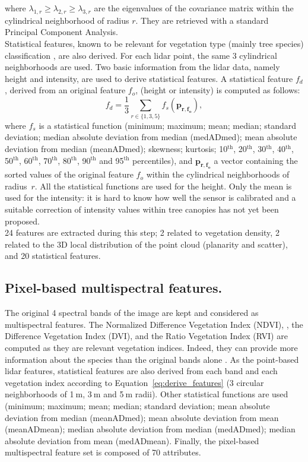 where $\lambda_{1,r}\geq\lambda_{2,r}\geq\lambda_{3,r}$ are the eigenvalues of the covariance matrix within the cylindrical neighborhood of radius $r$. They are retrieved with a standard Principal Component Analysis. \\
Statistical features, known to be relevant for vegetation type (mainly tree species) classification \citep{dalponte2014tree,torabzadeh2015optimal}, are also derived. For each lidar point, the same 3 cylindrical neighborhoods are used. Two basic information from the lidar data, namely height and intensity, are used to derive statistical features. A statistical feature $f_{d}$, derived from an original feature $f_{o}$, (height or intensity) is computed as follows: \\
\begin{equation}
f_{d} = \frac{1}{3}\sum_{r \in \{1,3,5\}}f_{s}(\mathbf{p_{r,f_{o}}}), 
\label{eq:derive_features}
\end{equation}
where $f_{s}$ is a statistical function (minimum; maximum; mean; median; standard deviation; median absolute deviation from median (medADmed); mean absolute deviation from median (meanADmed); skewness; kurtosis; 10$^{\text{th}}$, 20$^{\text{th}}$, 30$^{\text{th}}$, 40$^{\text{th}}$, 50$^{\text{th}}$, 60$^{\text{th}}$, 70$^{\text{th}}$, 80$^{\text{th}}$, 90$^{\text{th}}$ and 95$^{\text{th}}$ percentiles), and $\mathbf{p_{r,f_{o}}}$ a vector containing the sorted values of the original feature $f_{o}$ within the cylindrical neighborhoods of radius~$r$. All the statistical functions are used for the height. Only the mean is used for the intensity: it is hard to know how well the sensor is calibrated and a suitable correction of intensity values within tree canopies has not yet been proposed. \\
24 features are extracted during this step; 2 related to vegetation density, 2 related to the 3D local distribution of the point cloud (planarity and scatter), and 20 statistical features.

\subsection{Pixel-based multispectral features.}
The original 4 spectral bands of the image are kept and considered as multispectral features. The Normalized Difference Vegetation Index (NDVI), \citep{tucker1979red},
the Difference Vegetation Index (DVI), \citep{bacour2006normalization}
and the Ratio Vegetation Index (RVI) \citep{jordan1969derivation}
are computed as they are relevant vegetation indices. Indeed, they can provide more information about the species than the original bands alone \citep{zargar2011review}. As the point-based lidar features, statistical features are also derived from each band and each vegetation index according to Equation~\ref{eq:derive_features} (3 circular neighborhoods of 1$\:$m, 3$\:$m and 5$\:$m radii). Other statistical functions are used (minimum; maximum; mean; median; standard deviation; mean absolute deviation from median (meanADmed); mean absolute deviation from mean (meanADmean); median absolute deviation from median (medADmed); median absolute deviation from mean (medADmean). Finally, the pixel-based multispectral feature set is composed of 70 attributes.

